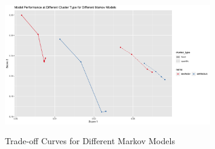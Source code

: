 \documentclass{article}
\begin{document}
\begin{figure}[htbp]
    \caption{Trade-off Curves for Different Markov Models}
    \centering
    \includegraphics[width = 0.8\textwidth]{images/ModelPerformanceatDifferentClusterTypeforDifferentMarkovModels.png}
    \label{fig:fig1.3.4}
\end{figure}
\end{document}
